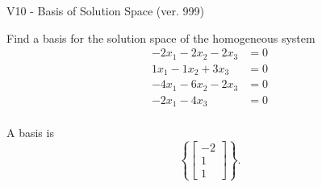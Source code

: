 \begin{exercise}
  \begin{exerciseTitle}V10 - Basis of Solution Space (ver. 999)\end{exerciseTitle}
  \begin{exerciseStatement}
    Find a basis for the solution space of the homogeneous system 
\begin{align*}
 -2 x_ 1 -2 x_ 2 -2 x_ 3 &= 0  \\ 
  1 x_ 1 -1 x_ 2 + 3 x_ 3 &= 0  \\ 
  -4 x_ 1 -6 x_ 2 -2 x_ 3 &= 0  \\ 
  -2 x_ 1 -4 x_ 3 &= 0  \\ 
 \end{align*}


 
  \end{exerciseStatement}

  \begin{exerciseAnswer}
   A basis is   
\[\left\{\left[\begin{array}{c}
-2 \\
1 \\
1
\end{array}\right]\right\}.\]

  


  \end{exerciseAnswer}
\end{exercise}